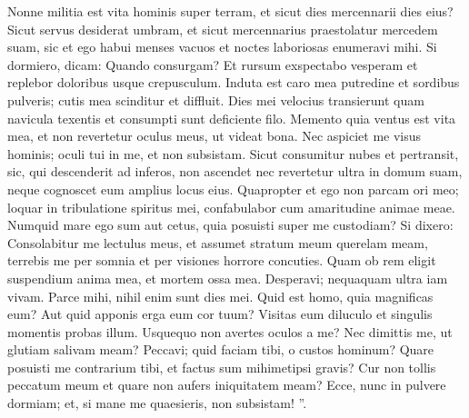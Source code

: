 \begin{biblechapter}
\begin{biblechapter}
\begin{biblechapter}
\begin{biblechapter}
\begin{biblechapter}
\begin{biblechapter}
\begin{biblechapter}
\verse Nonne militia est vita hominis super terram,
 et sicut dies mercennarii dies eius? 
\verse Sicut servus desiderat umbram,
 et sicut mercennarius praestolatur mercedem suam,
 \verse sic et ego habui menses vacuos
 et noctes laboriosas enumeravi mihi. 
\verse Si dormiero, dicam: Quando consurgam?
 Et rursum exspectabo vesperam
 et replebor doloribus usque crepusculum.
 \verse Induta est caro mea putredine et sordibus pulveris;
 cutis mea scinditur et diffluit.
 \verse Dies mei velocius transierunt quam navicula texentis
 et consumpti sunt deficiente filo.
 \verse Memento quia ventus est vita mea,
 et non revertetur oculus meus, ut videat bona.
 \verse Nec aspiciet me visus hominis;
 oculi tui in me, et non subsistam.
 \verse Sicut consumitur nubes et pertransit,
 sic, qui descenderit ad inferos, non ascendet
 \verse nec revertetur ultra in domum suam,
 neque cognoscet eum amplius locus eius.
 \verse Quapropter et ego non parcam ori meo;
 loquar in tribulatione spiritus mei, confabulabor cum amaritudine animae meae.
 \verse Numquid mare ego sum aut cetus,
 quia posuisti super me custodiam? 
\verse Si dixero: Consolabitur me lectulus meus,
 et assumet stratum meum querelam meam,
 \verse terrebis me per somnia
 et per visiones horrore concuties.
 \verse Quam ob rem eligit suspendium anima mea,
 et mortem ossa mea.
 \verse Desperavi; nequaquam ultra iam vivam.
 Parce mihi, nihil enim sunt dies mei.
 \verse Quid est homo, quia magnificas eum?
 Aut quid apponis erga eum cor tuum?
 \verse Visitas eum diluculo
 et singulis momentis probas illum. 
\verse Usquequo non avertes oculos a me?
 Nec dimittis me, ut glutiam salivam meam?
 \verse Peccavi; quid faciam tibi,
 o custos hominum?
 Quare posuisti me contrarium tibi, et factus sum mihimetipsi gravis?
 \verse Cur non tollis peccatum meum
 et quare non aufers iniquitatem meam?
 Ecce, nunc in pulvere dormiam;
 et, si mane me quaesieris, non subsistam! ”.
 

\end{biblechapter}
\end{biblechapter}
\end{biblechapter}
\end{biblechapter}
\end{biblechapter}
\end{biblechapter}
\end{biblechapter}
